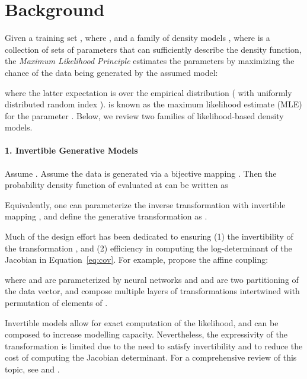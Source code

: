 \documentclass{article}
\begin{document}
\section{Background}
\label{sec:background}
Given a training set , where , and a family of density models , where  is a collection of sets of parameters that can sufficiently describe the density function, the \emph{Maximum Likelihood Principle} estimates the parameters by maximizing the chance of the data being generated by the assumed model:

where the latter expectation is over the empirical distribution  ( with uniformly distributed random index ). 
 is known as the maximum likelihood estimate (MLE) for the parameter . 
Below, we review two families of likelihood-based density models. 


\paragraph{1. Invertible Generative Models}
Assume .
Assume the data is generated via a bijective mapping . 
Then the probability density function of  evaluated at  can be written as

Equivalently, one can parameterize the inverse transformation  with invertible mapping , and define the generative transformation as .

Much of the design effort has been dedicated to ensuring (1) the invertibility of the transformation , and (2) efficiency in computing the log-determinant of the Jacobian in Equation~\ref{eq:cov}. 
For example, \citet{dinh2016density} propose the affine coupling:

where  and  are parameterized by neural networks and  and  are two partitioning of the data vector, 
and compose multiple layers of transformations intertwined with permutation of elements of . 


Invertible models allow for exact computation of the likelihood, and can be composed to increase modelling capacity. 
Nevertheless, the expressivity of the transformation is limited due to the need to satisfy invertibility and to reduce the cost of computing the Jacobian determinant. 
For a comprehensive review of this topic, see \citet{kobyzev2019normalizing} and \citet{papamakarios2019normalizing}.
\end{document}

